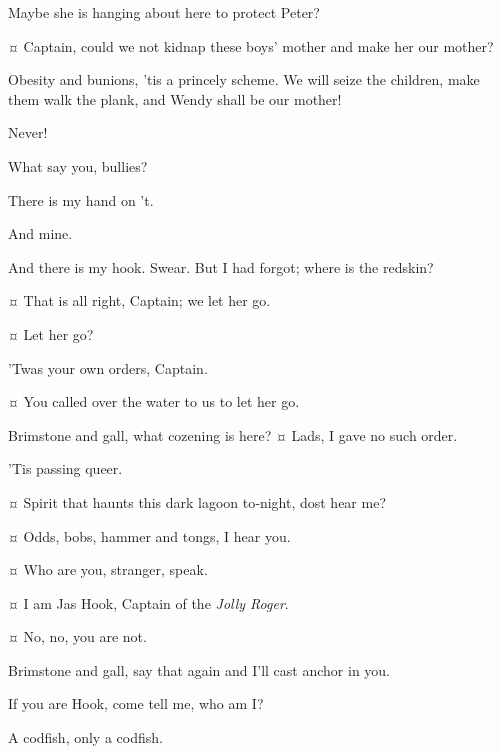 \begin{drama}
\starkeyspeaks
Maybe she is hanging about here to protect Peter?


\smeespeaks {}¤
Captain, could we not kidnap these boys’ mother and make her our mother?

\hookspeaks
Obesity and bunions, ’tis a princely scheme.
We will seize the children, make them walk the plank, and Wendy shall be our mother!

\wendyspeaks
Never!

\hookspeaks
What say you, bullies?

\smeespeaks
There is my hand on ’t.

\starkeyspeaks
And mine.

\hookspeaks
And there is my hook.
Swear.
But I had forgot; where is the redskin?

\smeespeaks {}¤
That is all right, Captain; we let her go.

\hookspeaks {}¤
Let her go?

\smeespeaks
’Twas your own orders, Captain.

\starkeyspeaks {}¤
You called over the water to us to let her go.

\hookspeaks
Brimstone and gall, what cozening is here?
¤
Lads, I gave no such order.

\smeespeaks
’Tis passing queer.

\hookspeaks {}¤
Spirit that haunts this dark lagoon to‐night, dost hear me?

\peterspeaks {}¤
Odds, bobs, hammer and tongs, I hear you.

\hookspeaks {}¤
Who are you, stranger, speak.

\peterspeaks {}¤
I am Jas Hook, Captain of the \emph{Jolly Roger}.

\hookspeaks {}¤
No, no, you are not.

\peterspeaks
Brimstone and gall, say that again and I’ll cast anchor in you.

\hookspeaks
If you are Hook, come tell me, who am I?

\peterspeaks
A codfish, only a codfish.


\end{drama}
